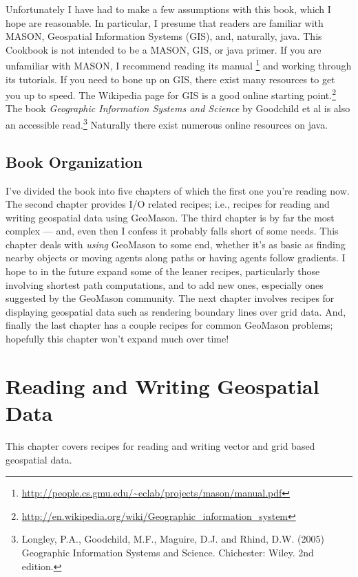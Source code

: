 \documentclass[twoside,10pt]{book}
\begin{document}
Unfortunately I have had to make a few assumptions with this book,
which I hope are reasonable.  In particular, I presume that readers
are familiar with MASON, Geospatial Information Systems (GIS), and,
naturally, java.  This Cookbook is not intended to be a MASON, GIS, or
java primer.  If you are unfamiliar with MASON, I recommend reading
its manual
\footnote{\url{http://people.cs.gmu.edu/~eclab/projects/mason/manual.pdf}}
and working through its tutorials.  If you need to bone up on GIS,
there exist many resources to get you up to speed.  The Wikipedia page
for GIS is a good online starting
point.\footnote{\url{http://en.wikipedia.org/wiki/Geographic_information_system}}
The book \emph{Geographic Information Systems and Science} by
Goodchild et al is also an accessible read.\footnote{Longley, P.A.,
  Goodchild, M.F., Maguire, D.J. and Rhind, D.W. (2005) Geographic
  Information Systems and Science. Chichester: Wiley. 2nd edition.}
Naturally there exist numerous online resources on java.

\section{Book Organization}

I've divided the book into five chapters of which the first one
you're reading now.  The second chapter provides I/O related recipes;
i.e., recipes for reading and writing geospatial data using GeoMason.
The third chapter is by far the most complex --- and, even then I
confess it probably falls short of some needs.  This chapter deals
with \emph{using} GeoMason to some end, whether it's as basic as
finding nearby objects or moving agents along paths or having agents
follow gradients. I hope to in the future expand some of the leaner
recipes, particularly those involving shortest path computations, and
to add new ones, especially ones suggested by the GeoMason community.
The next chapter involves recipes for displaying geospatial data such
as rendering boundary lines over grid data.  And, finally the last
chapter has a couple recipes for common GeoMason problems; hopefully
this chapter won't expand much over time!



\chapter{Reading and Writing Geospatial Data}
\label{ch:io}

This chapter covers recipes for reading and writing vector and grid based geospatial data.
\end{document}
